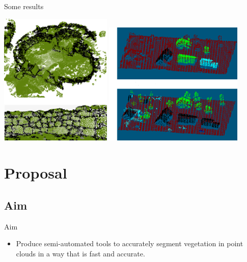 \documentclass{beamer}
\begin{document}
\begin{frame}{Some results}

\includegraphics[width=0.4\textwidth]{pics/spina2.png}
\includegraphics[width=0.5\textwidth]{pics/shapovalov.png}

\end{frame}


\section{Proposal}

\subsection{Aim}

\begin{frame}{Aim}
\begin{itemize}

\item
Produce semi-automated tools to accurately segment vegetation in point clouds in a way that is fast and accurate.

\end{itemize}


\end{frame}
\end{document}
